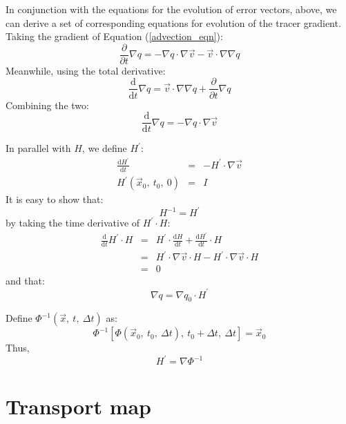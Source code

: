 \documentclass[12pt]{article}
\begin{document}
In conjunction with the equations for the evolution of error vectors, above,
we can derive a set of corresponding equations for evolution of the tracer
gradient.  Taking the gradient of Equation (\ref{advection_eqn}):
\begin{equation}
\frac{\partial}{\partial t} \nabla q = -\nabla q \cdot \nabla \vec v -
		\vec v \cdot \nabla \nabla q 
\end{equation}
Meanwhile, using the total derivative:
\begin{equation}
\frac{\mathrm d}{\mathrm d t} \nabla q = \vec v \cdot \nabla \nabla q + 
		\frac{\partial}{\partial t} \nabla q
\end{equation}
Combining the two:
\begin{equation}
\frac{\mathrm d}{\mathrm d t} \nabla q = -\nabla q \cdot \nabla \vec v
\label{evolution_tracer_gradient}
\end{equation}

In parallel with $H$, we define $H^\prime$:
\begin{eqnarray}
\frac{\mathrm d H^\prime}{\mathrm d t} & = & -H^\prime \cdot \nabla \vec v\\
\label{inverse_deformation_matrix}
H^\prime(\vec x_0,~t_0,~0) & = & I
\end{eqnarray}
It is easy to show that:
\begin{equation}
H^{-1}=H^\prime
\end{equation}
by taking the time derivative of $H^\prime \cdot H$:
\begin{eqnarray}
\frac{\mathrm d}{\mathrm d t} H^\prime \cdot H & = & 
		H^\prime \cdot \frac{\mathrm d H}{\mathrm d t} +
		\frac{\mathrm d H^\prime}{\mathrm d t} \cdot H\\
		& = & H^\prime \cdot \nabla \vec v \cdot H 
		- H^\prime \cdot \nabla \vec v \cdot H \\
		& = & 0
\end{eqnarray}
and that:
\begin{equation}
\nabla q = \nabla q_0 \cdot H^\prime
\end{equation}

Define $\Phi^{-1}(\vec x,~t,~\Delta t)$ as:
\begin{equation}
\Phi^{-1}[\Phi(\vec x_0,~t_0,~\Delta t),~t_0+\Delta t,~\Delta t]=\vec x_0
\end{equation}
Thus,
\begin{equation}
H^\prime=\nabla \Phi^{-1}
\end{equation}

\section{Transport map}
\end{document}
